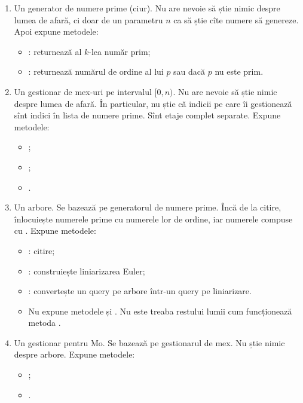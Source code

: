 \documentclass[../main.tex]{subfiles}
\begin{document}
\begin{enumerate}
  \item Un generator de numere prime (ciur). Nu are nevoie să știe nimic despre lumea de afară, ci doar de un parametru $n$ ca să știe cîte numere să genereze. Apoi expune metodele:

  \begin{itemize}
    \item {}: returnează al $k$-lea număr prim;
    \item {}: returnează numărul de ordine al lui $p$ sau  dacă $p$ nu este prim.
  \end{itemize}

  \item Un gestionar de mex-uri pe intervalul $[0, n)$. Nu are nevoie să știe nimic despre lumea de afară. În particular, nu știe că indicii pe care îi gestionează sînt indici în lista de numere prime. Sînt etaje complet separate. Expune metodele:

  \begin{itemize}
    \item {};
    \item {};
    \item {}.
  \end{itemize}

  \item Un arbore. Se bazează pe generatorul de numere prime. Încă de la citire, înlocuiește numerele prime cu numerele lor de ordine, iar numerele compuse cu . Expune metodele:

  \begin{itemize}
    \item {}: citire;
    \item {}: construiește liniarizarea Euler;
    \item {}: convertește un query pe arbore într-un query pe liniarizare.
    \item Nu expune metodele  și . Nu este treaba restului lumii cum funcționează metoda .
  \end{itemize}

  \item Un gestionar pentru Mo. Se bazează pe gestionarul de mex. Nu știe nimic despre arbore. Expune metodele:

  \begin{itemize}
    \item {};
    \item {}.
  \end{itemize}


\end{enumerate}
\end{document}

